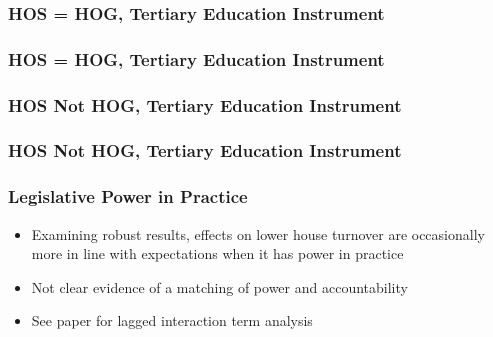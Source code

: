 \documentclass{beamer}
\begin{document}
    \begin{frame}
        \frametitle{HOS = HOG, Tertiary Education Instrument}
        {
            \let\oldcentering\centering
            \renewcommand\centering{\tiny\oldcentering}
            
        }
    \end{frame}

    \begin{frame}
        \frametitle{HOS = HOG, Tertiary Education Instrument}
        {
            \let\oldcentering\centering
            \renewcommand\centering{\tiny\oldcentering}
            
        }
    \end{frame}

    \begin{frame}
        \frametitle{HOS Not HOG, Tertiary Education Instrument}
        {
            \let\oldcentering\centering
            \renewcommand\centering{\tiny\oldcentering}
            
        }
    \end{frame}

    \begin{frame}
        \frametitle{HOS Not HOG, Tertiary Education Instrument}
        {
            \let\oldcentering\centering
            \renewcommand\centering{\tiny\oldcentering}
            
        }
    \end{frame}

    \begin{frame}
        \frametitle{Legislative Power in Practice}
        \begin{itemize}
            \item Examining robust results, effects on lower house turnover are occasionally more in line with expectations when it has power in practice
            \item Not clear evidence of a matching of power and accountability
            \item See paper for lagged interaction term analysis
        \end{itemize}
    \end{frame}
\end{document}
